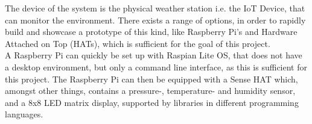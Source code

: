 The device of the system is the physical weather station i.e. the IoT Device, that can monitor the environment. There exists a range of options, in order to rapidly build and showcase a prototype of this kind, like Raspberry Pi's\cite{RPI3} and Hardware Attached on Top (HATs)\cite{HATs}, which is sufficient for the goal of this project.\\

A Raspberry Pi can quickly be set up with Raspian Lite OS\cite{Raspbian}, that does not have a desktop environment, but only a command line interface, as this is sufficient for this project. The Raspberry Pi can then be equipped with a Sense HAT\cite{SenseHAT} which, amongst other things, contains a pressure-, temperature- and humidity sensor, and a 8x8 LED matrix display, supported by libraries in different programming languages.

